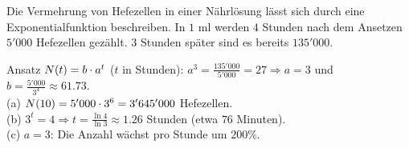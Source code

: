 \documentclass[11pt]{exam}
\begin{document}
\begin{questions}
\question[6]
Die Vermehrung von Hefezellen in einer Nährlösung lässt sich durch eine Exponentialfunktion beschreiben. In $1$ ml werden $4$ Stunden nach dem Ansetzen $5'000$ Hefezellen gezählt. $3$ Stunden später sind es bereits $135'000$.
{\begin{solution}
		Ansatz $N(t)=b\cdot a^t$ ($t$ in Stunden): $a^3=\frac{135'000}{5'000}=27\Rightarrow a=3$ und $b=\frac{5'000}{3^4}\approx61.73$.\\
		(a) $N(10)=5'000\cdot3^6=3'645'000$ Hefezellen.\\
		(b) $3^t=4\Rightarrow t=\frac{\ln{4}}{\ln{3}}\approx1.26$ Stunden (etwa $76$ Minuten).\\
		(c) $a=3$: Die Anzahl wächst pro Stunde um $200\%$.
\end{solution}}
{}

\end{questions}
\end{document}
